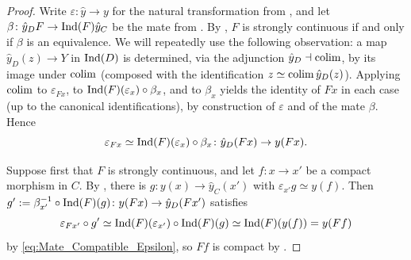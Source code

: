 	\begin{proof}
		Write $\varepsilon\colon \hat{y} \to y$ for the natural transformation from , and let $\beta\colon \hat{y}_DF \to \operatorname{Ind}(F)\hat{y}_C$ be the mate from . By , $F$ is strongly continuous if and only if $\beta$ is an equivalence. We will repeatedly use the following observation: a map $\hat{y}_D(z) \to Y$ in $\operatorname{Ind}(D)$ is determined, via the adjunction $\hat{y}_D \dashv \operatorname{colim}$, by its image under $\operatorname{colim}$ (composed with the identification $z \simeq \operatorname{colim}\hat{y}_D(z)$). Applying $\operatorname{colim}$ to $\varepsilon_{Fx}$, to $\operatorname{Ind}(F)(\varepsilon_x) \circ \beta_x$, and to $\beta_x$ yields the identity of $Fx$ in each case (up to the canonical identifications), by construction of $\varepsilon$ and of the mate $\beta$. Hence
		\begin{equation}
			\label{eq:Mate_Compatible_Epsilon}
			\varepsilon_{Fx} \simeq \operatorname{Ind}(F)(\varepsilon_x) \circ \beta_x\colon \hat{y}_D(Fx) \to y(Fx).
		\end{equation}

		Suppose first that $F$ is strongly continuous, and let $f\colon x \to x'$ be a compact morphism in $C$. By , there is $g\colon y(x) \to \hat{y}_C(x')$ with $\varepsilon_{x'}g \simeq y(f)$. Then $g' := \beta_{x'}^{-1} \circ \operatorname{Ind}(F)(g)\colon y(Fx) \to \hat{y}_D(Fx')$ satisfies
		\[
			\varepsilon_{Fx'} \circ g' \simeq \operatorname{Ind}(F)(\varepsilon_{x'}) \circ \operatorname{Ind}(F)(g) \simeq \operatorname{Ind}(F)(y(f)) = y(Ff)
		\]
		by \eqref{eq:Mate_Compatible_Epsilon}, so $Ff$ is compact by .


\end{proof}
